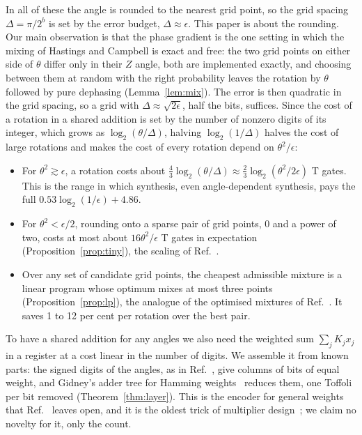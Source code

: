 \documentclass[aps,prx,twocolumn,superscriptaddress,nofootinbib,longbibliography]{revtex4-2}
\theoremstyle{remark}
\begin{document}
In all of these the angle is rounded to the nearest grid point, so the grid spacing $\Delta=\pi/
2^b$ is set by the error budget, $\Delta\approx\epsilon$. This paper is about the rounding. Our
main observation is that the phase gradient is the one setting in which the mixing of
Hastings and Campbell is exact and free: the two grid points on either side of $\theta$ differ
only in their $Z$ angle, both are implemented exactly, and choosing between them at random with
the right probability leaves the rotation by $\theta$ followed by pure dephasing
(Lemma~\ref{lem:mix}). The error is then quadratic in the grid spacing, so a grid with
$\Delta\approx\sqrt{2\epsilon}$, half the bits, suffices. Since the cost of a rotation in a
shared addition is set by the number of nonzero digits of its integer, which grows as
$\log_2(\theta/\Delta)$, halving $\log_2(1/\Delta)$ halves the cost of large rotations and makes
the cost of every rotation depend on $\theta^2/\epsilon$:
\begin{itemize}
\item For $\theta^2\gtrsim\epsilon$, a rotation costs about
  $\tfrac43\log_2(\theta/\Delta)\approx\tfrac23\log_2(\theta^2/2\epsilon)$ T gates. This is the
  range in which synthesis, even angle-dependent synthesis, pays the full
  $0.53\log_2(1/\epsilon)+4.86$.
\item For $\theta^2<\epsilon/2$, rounding onto a sparse pair of grid points, $0$ and a power of
  two, costs at most about $16\theta^2/\epsilon$ T gates in expectation
  (Proposition~\ref{prop:tiny}), the scaling of Ref.~\cite{Bothe2026}.
\item Over any set of candidate grid points, the cheapest admissible mixture is a linear program
  whose optimum mixes at most three points (Proposition~\ref{prop:lp}), the analogue of the
  optimised mixtures of Ref.~\cite{Kliuchnikov2023}. It saves 1 to 12 per cent per rotation over
  the best pair.
\end{itemize}
To have a shared addition for any angles we also need the weighted sum $\sum_jK_jx_j$ in a
register at a cost linear in the number of digits. We assemble it from known parts: the signed
digits of the angles, as in Ref.~\cite{Sanders2020}, give columns of bits of equal weight, and
Gidney's adder tree for Hamming weights~\cite{Gidney2018} reduces them, one Toffoli per bit
removed (Theorem~\ref{thm:layer}). This is the encoder for general weights that
Ref.~\cite{Wu2026} leaves open, and it is the oldest trick of multiplier
design~\cite{Wallace1964}; we claim no novelty for it, only the count.
\end{document}
